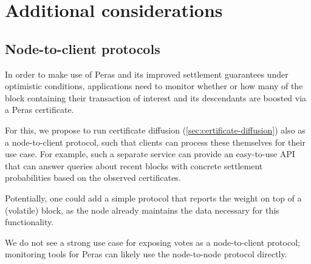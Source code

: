\section{Additional considerations}

\subsection{Node-to-client protocols}

In order to make use of Peras and its improved settlement guarantees under optimistic conditions, applications need to monitor whether or how many of the block containing their transaction of interest and its descendants are boosted via a Peras certificate.

For this, we propose to run certificate diffusion (\cref{sec:certificate-diffusion}) also as a node-to-client protocol, such that clients can process these themselves for their use case.
For example, such a separate service can provide an easy-to-use API that can answer queries about recent blocks with concrete settlement probabilities based on the observed certificates.

Potentially, one could add a simple protocol that reports the weight on top of a (volatile) block, as the node already maintains the data necessary for this functionality.

We do not see a strong use case for exposing votes as a node-to-client protocol; monitoring tools for Peras can likely use the node-to-node protocol directly.



